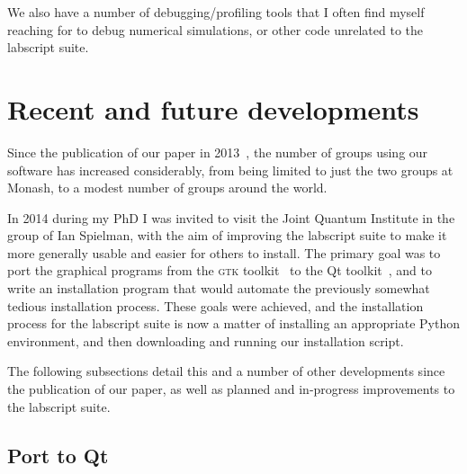 We also have a number of debugging/profiling tools that I often find myself reaching for to debug numerical simulations, or other code unrelated to the labscript suite.


\section{Recent and future developments}

Since the publication of our paper in 2013~\cite{starkey_scripted_2013}, the number of groups using our software has increased considerably, from being limited to just the two groups at Monash, to a modest number of groups around the world.

In 2014 during my PhD I was invited to visit the Joint Quantum Institute in the group of Ian Spielman, with the aim of improving the labscript suite to make it more generally usable and easier for others to install. The primary goal was to port the graphical programs from the \textsc{gtk} toolkit~\cite{the_gnome_project_gtk+_2018} to the Qt toolkit~\cite{the_qt_company_qt_2018}, and to write an installation program that would automate the previously somewhat tedious installation process. These goals were achieved, and the installation process for the labscript suite is now a matter of installing an appropriate Python environment, and then downloading and running our installation script.

The following subsections detail this and a number of other developments since the publication of our paper, as well as planned and in-progress improvements to the labscript suite.

\subsection{Port to Qt}

